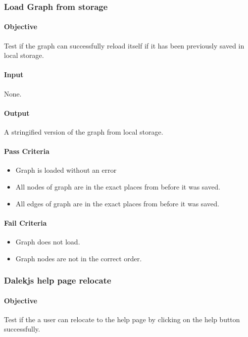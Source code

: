 \documentclass[hidelinks,english]{article}
\begin{document}
			\subsubsection{Load Graph from storage}
			\label{frontendloadstoragetopicsdalekjstest}
    			\paragraph{Objective} Test if the graph can successfully reload itself if it has been previously saved in local storage.
    			\paragraph{Input} None.
    			\paragraph{Output} A stringified version of the graph from local storage.
			    \paragraph{Pass Criteria}
				\begin{itemize}
				    \item Graph is loaded without an error
				    \item All nodes of graph are in the exact places from before it was saved.
				    \item All edges of graph are in the exact places from before it was saved.
				\end{itemize}
				\paragraph{Fail Criteria}
				\begin{itemize}
				    \item Graph does not load.
				    \item Graph nodes are not in the correct order.
				\end{itemize}
		    \subsubsection{Dalekjs help page relocate}
		    \label{frontendhelpdalekjstest}
    			\paragraph{Objective} Test if the a user can relocate to the help page by clicking on the help button successfully.
\end{document}
